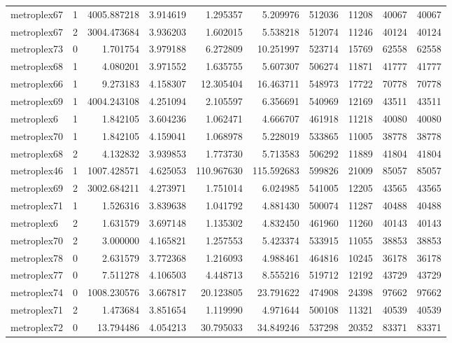 \documentclass[../../../thesis.tex]{subfiles}
\begin{document}
\begin{longtable}{|l|r|r|r|r|r|r|r|r|r|}
metroplex67 & 1 & 4005.887218 & 3.914619 & 1.295357 & 5.209976 & 512036 & 11208 & 40067 & 40067 \\
metroplex67 & 2 & 3004.473684 & 3.936203 & 1.602015 & 5.538218 & 512074 & 11246 & 40124 & 40124 \\
metroplex73 & 0 & 1.701754 & 3.979188 & 6.272809 & 10.251997 & 523714 & 15769 & 62558 & 62558 \\
metroplex68 & 1 & 4.080201 & 3.971552 & 1.635755 & 5.607307 & 506274 & 11871 & 41777 & 41777 \\
metroplex66 & 1 & 9.273183 & 4.158307 & 12.305404 & 16.463711 & 548973 & 17722 & 70778 & 70778 \\
metroplex69 & 1 & 4004.243108 & 4.251094 & 2.105597 & 6.356691 & 540969 & 12169 & 43511 & 43511 \\
metroplex6 & 1 & 1.842105 & 3.604236 & 1.062471 & 4.666707 & 461918 & 11218 & 40080 & 40080 \\
metroplex70 & 1 & 1.842105 & 4.159041 & 1.068978 & 5.228019 & 533865 & 11005 & 38778 & 38778 \\
metroplex68 & 2 & 4.132832 & 3.939853 & 1.773730 & 5.713583 & 506292 & 11889 & 41804 & 41804 \\
metroplex46 & 1 & 1007.428571 & 4.625053 & 110.967630 & 115.592683 & 599826 & 21009 & 85057 & 85057 \\
metroplex69 & 2 & 3002.684211 & 4.273971 & 1.751014 & 6.024985 & 541005 & 12205 & 43565 & 43565 \\
metroplex71 & 1 & 1.526316 & 3.839638 & 1.041792 & 4.881430 & 500074 & 11287 & 40488 & 40488 \\
metroplex6 & 2 & 1.631579 & 3.697148 & 1.135302 & 4.832450 & 461960 & 11260 & 40143 & 40143 \\
metroplex70 & 2 & 3.000000 & 4.165821 & 1.257553 & 5.423374 & 533915 & 11055 & 38853 & 38853 \\
metroplex78 & 0 & 2.631579 & 3.772368 & 1.216093 & 4.988461 & 464816 & 10245 & 36178 & 36178 \\
metroplex77 & 0 & 7.511278 & 4.106503 & 4.448713 & 8.555216 & 519712 & 12192 & 43729 & 43729 \\
metroplex74 & 0 & 1008.230576 & 3.667817 & 20.123805 & 23.791622 & 474908 & 24398 & 97662 & 97662 \\
metroplex71 & 2 & 1.473684 & 3.851654 & 1.119990 & 4.971644 & 500108 & 11321 & 40539 & 40539 \\
metroplex72 & 0 & 13.794486 & 4.054213 & 30.795033 & 34.849246 & 537298 & 20352 & 83371 & 83371 \\

\end{longtable}
\end{document}

